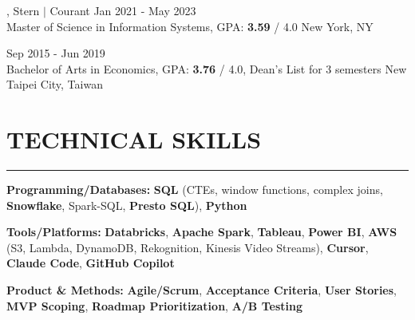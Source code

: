\documentclass[11pt,letterpaper]{article}
\begin{document}
\vspace{2pt}
, Stern $|$ Courant \hfill Jan 2021 - May 2023\\[-1pt]
Master of Science in Information Systems, GPA: \textbf{3.59} / 4.0 \hfill New York, NY

\vspace{2pt}
 \hfill Sep 2015 - Jun 2019\\[-1pt]
Bachelor of Arts in Economics, GPA: \textbf{3.76} / 4.0, Dean's List for 3 semesters \hfill New Taipei City, Taiwan

\vspace{2pt}
\section*{TECHNICAL SKILLS}
\vspace{-6pt}\noindent\rule{\textwidth}{0.8pt}

\vspace{2pt}
\noindent\textbf{Programming/Databases:} \textbf{SQL} (CTEs, window functions, complex joins, \textbf{Snowflake}, Spark-SQL, \textbf{Presto SQL}), \textbf{Python}

\vspace{2pt}
\noindent\textbf{Tools/Platforms:} \textbf{Databricks}, \textbf{Apache Spark}, \textbf{Tableau}, \textbf{Power BI}, \textbf{AWS} (S3, Lambda, DynamoDB, Rekognition, Kinesis Video Streams), \textbf{Cursor}, \textbf{Claude Code}, \textbf{GitHub Copilot}

\vspace{2pt}
\noindent\textbf{Product \& Methods:} \textbf{Agile/Scrum}, \textbf{Acceptance Criteria}, \textbf{User Stories}, \textbf{MVP Scoping}, \textbf{Roadmap Prioritization}, \textbf{A/B Testing}
\end{document}
